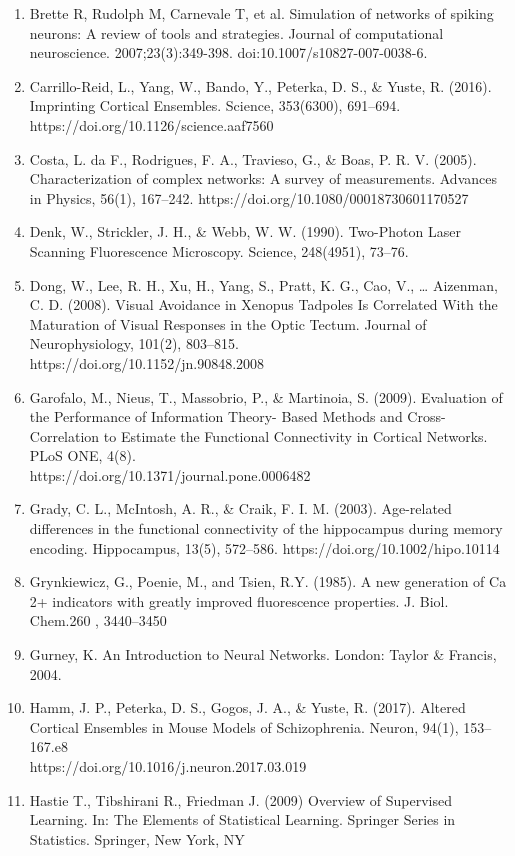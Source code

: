 \documentclass[11pt]{article}
\begin{document}
\begin{enumerate}
\item Brette R, Rudolph M, Carnevale T, et al. Simulation of networks of spiking neurons: A review of tools and strategies. Journal of computational neuroscience. 2007;23(3):349-398. doi:10.1007/s10827-007-0038-6.
\item Carrillo-Reid, L., Yang, W., Bando, Y., Peterka, D. S., \& Yuste, R. (2016). Imprinting Cortical Ensembles. Science, 353(6300), 691–694. https://doi.org/10.1126/science.aaf7560
\item Costa, L. da F., Rodrigues, F. A., Travieso, G., & Boas, P. R. V. (2005). Characterization of complex networks: A survey of measurements. Advances in Physics, 56(1), 167–242. https://doi.org/10.1080/00018730601170527
\item Denk, W., Strickler, J. H., \& Webb, W. W. (1990). Two-Photon Laser Scanning Fluorescence Microscopy. Science, 248(4951), 73–76.
\item Dong, W., Lee, R. H., Xu, H., Yang, S., Pratt, K. G., Cao, V., … Aizenman, C. D. (2008). Visual Avoidance in Xenopus Tadpoles Is Correlated With the Maturation of Visual Responses in the Optic Tectum. Journal of Neurophysiology, 101(2), 803–815.\\https://doi.org/10.1152/jn.90848.2008
\item Garofalo, M., Nieus, T., Massobrio, P., \& Martinoia, S. (2009). Evaluation of the Performance of Information Theory- Based Methods and Cross-Correlation to Estimate the Functional Connectivity in Cortical Networks. PLoS ONE, 4(8).\\https://doi.org/10.1371/journal.pone.0006482
\item Grady, C. L., McIntosh, A. R., \& Craik, F. I. M. (2003). Age-related differences in the functional connectivity of the hippocampus during memory encoding. Hippocampus, 13(5), 572–586. https://doi.org/10.1002/hipo.10114
\item Grynkiewicz, G., Poenie, M., and Tsien, R.Y. (1985). A new generation of Ca 2+ indicators with greatly improved fluorescence properties. J. Biol. Chem.260 , 3440–3450
\item Gurney, K. An Introduction to Neural Networks. London: Taylor \& Francis, 2004.
\item Hamm, J. P., Peterka, D. S., Gogos, J. A., \& Yuste, R. (2017). Altered Cortical Ensembles in Mouse Models of Schizophrenia. Neuron, 94(1), 153–167.e8\\https://doi.org/10.1016/j.neuron.2017.03.019
\item Hastie T., Tibshirani R., Friedman J. (2009) Overview of Supervised Learning. In: The Elements of Statistical Learning. Springer Series in Statistics. Springer, New York, NY

\end{enumerate}
\end{document}
